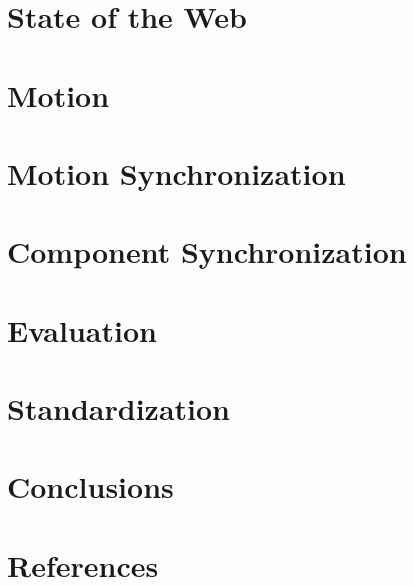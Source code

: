 \documentclass[graybox]{svmult}
\begin{document}
\section{State of the Web}
\label{sec:web}
%

\section{Motion}
\label{sec:motion}
%

\section{Motion Synchronization}
\label{sec:motionsync}
%

\section{Component Synchronization}
\label{sec:compsync}
%

\section{Evaluation}
\label{sec:eval}
%

\section{Standardization}
\label{sec:standard}
%

\section{Conclusions}
\label{sec:concl}
%

\section*{References}

 
\end{document}
